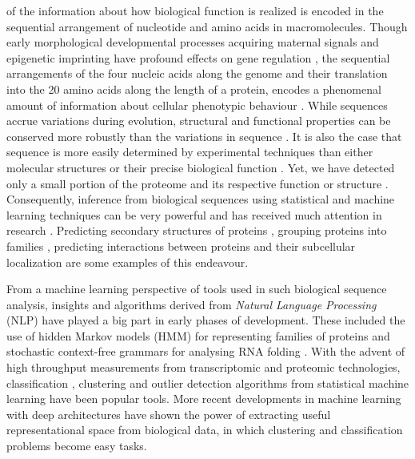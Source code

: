 \documentclass[10pt,journal,compsoc,twoside]{IEEEtran}
\begin{document}
% 
% 
% 
 of the information about how biological function is realized is encoded in the sequential arrangement of nucleotide and amino acids in macromolecules. Though early morphological developmental processes acquiring maternal signals and epigenetic imprinting have profound effects on gene regulation \cite{genomic_imprinting_parental_influence}, the sequential arrangements of the four nucleic acids along the genome and their translation into the 20 amino acids along the length of a protein, encodes a phenomenal amount of information about cellular phenotypic behaviour \cite{durbin}. While sequences accrue variations during evolution, structural and functional properties can be conserved more robustly than the variations in sequence \cite{variation_prot}. It is also the case that sequence is more easily determined by experimental techniques than either molecular structures or their precise biological function \cite{lee_redfern_orengo_2007}. Yet, we have detected only a small portion of the proteome and its respective function or structure \cite{dark-proteome1} \cite{dark_proteome2}. Consequently, inference from biological sequences using statistical and machine learning techniques can be very powerful and has received much attention in research \cite{durbin} \cite{pellegrini_2016}. Predicting secondary structures of proteins \cite{jpred4} \cite{Ni}, grouping proteins into families \cite{dani} \cite{pfam}, predicting interactions between proteins \cite{prot-interaction} and their subcellular localization \cite{prot-Subcellular} \cite{psortb} are some examples of this endeavour. 

From a machine learning perspective of tools used in such biological sequence analysis, insights and algorithms derived from \textit{Natural Language Processing} (NLP) \cite{nlp_fundamentals} have played a big part in early phases of development. These included the use of hidden Markov models (HMM) for representing families of proteins and stochastic context-free grammars for analysing RNA folding \cite{durbin}. With the advent of high throughput measurements from transcriptomic and proteomic technologies, classification \cite{haussler-pnas-paper}, clustering \cite{spellman} and outlier detection algorithms \cite{gunawardana_outlier} from statistical machine learning have been popular tools. More recent developments in machine learning with deep architectures \cite{deep-genomics-review} \cite{barash_splicing} \cite{jaganathan_2019} have shown the power of extracting useful representational space from biological data, in which clustering and classification problems become easy tasks.
\end{document}
